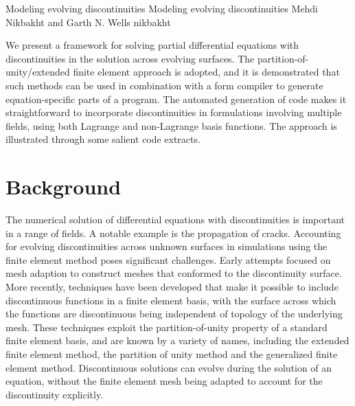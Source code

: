 \newcommand{\vect}[1]{#1} %
\newcommand{\dif}{\, d}
\newcommand{\disc}[1]{\left\llbracket {#1} \right\rrbracket}
\newcommand{\pd}{\partial}

\newcommand{\eps}{\epsilon}

              {Modeling evolving discontinuities}
              {Modeling evolving discontinuities}
              {Mehdi Nikbakht and Garth N. Wells}
              {nikbakht}

We present a framework for solving partial differential equations
with discontinuities in the solution across evolving surfaces. The
partition-of-unity/extended finite element approach is adopted, and
it is demonstrated that such methods can be used in combination with
a form compiler to generate equation-specific parts of a program. The
automated generation of code makes it straightforward to incorporate
discontinuities in formulations involving multiple fields, using both
Lagrange and non-Lagrange basis functions.  The approach is illustrated
through some salient code extracts.

\enlargethispage{6pt}

\section{Background}

The numerical solution of differential equations with discontinuities is
important in a range of fields. A notable example is the propagation of
cracks. Accounting for evolving discontinuities across \apriori{}
unknown surfaces in simulations using the finite element method poses
significant challenges.  Early attempts focused on mesh adaption to
construct meshes that conformed to the discontinuity surface.  More
recently, techniques have been developed that make it possible to include
discontinuous functions in a finite element basis, with the surface across
which the functions are discontinuous being independent of topology of
the underlying mesh. These techniques exploit the partition-of-unity
property of a standard finite element basis, and are known by a variety
of names, including the extended finite element method, the partition of unity method and the generalized finite element method.  Discontinuous solutions can evolve during the
solution of an equation, without the finite element mesh being adapted
to account for the discontinuity explicitly.

